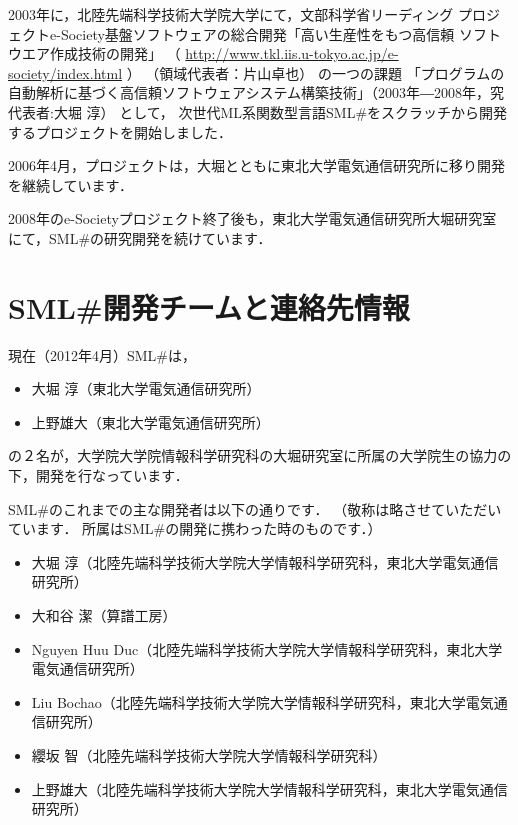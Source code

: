 \documentclass{jbook}
\newcommand{\smlsharp}{SML\#}
\begin{document}
	2003年に，北陸先端科学技術大学院大学にて，文部科学省リーディング
プロジェクトe-Society基盤ソフトウェアの総合開発「高い生産性をもつ高信頼
ソフトウエア作成技術の開発」
（
\url{http://www.tkl.iis.u-tokyo.ac.jp/e-society/index.html}
）
（領域代表者：片山卓也）
の一つの課題
「プログラムの自動解析に基づく高信頼ソフトウェアシステム構築技術」（2003年―2008年，究代表者:大堀 淳）
として，
次世代ML系関数型言語\smlsharp{}をスクラッチから開発するプロジェクトを開始しました．

2006年4月，プロジェクトは，大堀とともに東北大学電気通信研究所に移り開発
を継続しています．

2008年のe-Societyプロジェクト終了後も，東北大学電気通信研究所大堀研究室
にて，\smlsharp{}の研究開発を続けています．
	
\section{\smlsharp{}開発チームと連絡先情報}
\label{sec:smlsharpTeam}

	現在（2012年4月）\smlsharp{}は，
\begin{itemize}
\item 
大堀 淳（東北大学電気通信研究所）
\item 
上野雄大（東北大学電気通信研究所）
\end{itemize}
の２名が，大学院大学院情報科学研究科の大堀研究室に所属の大学院生の協力の
下，開発を行なっています．

	\smlsharp{}のこれまでの主な開発者は以下の通りです．
	（敬称は略させていただいています．
	所属は\smlsharp{}の開発に携わった時のものです．）
\begin{itemize}
\item 大堀 淳（北陸先端科学技術大学院大学情報科学研究科，東北大学電気通信研究所）
\item 大和谷 潔（算譜工房）
\item Nguyen Huu Duc（北陸先端科学技術大学院大学情報科学研究科，東北大学電気通信研究所）
\item Liu Bochao（北陸先端科学技術大学院大学情報科学研究科，東北大学電気通信研究所）
\item 纓坂 智（北陸先端科学技術大学院大学情報科学研究科）
\item 上野雄大（北陸先端科学技術大学院大学情報科学研究科，東北大学電気通信研究所）
\end{itemize}
\end{document}
